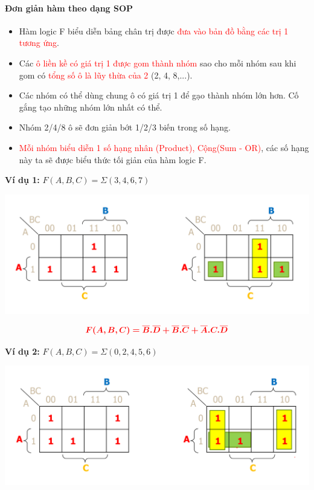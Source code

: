 \documentclass[12pt]{article}
\begin{document}
\begin{sloppypar}
\paragraph{Đơn giản hàm theo dạng SOP}

\begin{itemize}
    \item {Hàm logic F biểu diễn bảng chân trị được \textcolor{red}{đưa vào bản đồ bằng các trị 1 tương ứng}.}
    \item Các \textcolor{red}{ô liền kề có giá trị 1 được gom thành nhóm} sao cho mỗi nhóm sau khi gom có \textcolor{red}{tổng số ô là lũy thừa của 2} (2, 4, 8,...).
    \item Các nhóm có thể dùng chung ô có giá trị 1 để gạo thành nhóm lớn hơn. Cố gắng tạo những nhóm lớn nhất có thể.
    \item Nhóm 2/4/8 ô sẽ đơn giản bớt 1/2/3 biến trong số hạng.
    \item \textcolor{red}{Mỗi nhóm biểu diễn 1 số hạng nhân (Product), Cộng(Sum - OR)}, các số hạng này ta sẽ được biểu thức tối giản của hàm logic F.
\end{itemize}


\begin{tcolorbox}
    \textbf{Ví dụ 1:} \(F(A,B,C) = \Sigma(3,4,6,7)\)
\end{tcolorbox}

\includegraphics[width=15cm]{sop_ex1.png}

\begin{equation*}
    \color{red}
    \bm{F(A,B,C) = \overline{B}.\overline{D} + \overline{B}.\overline{C} + \overline{A}.C.\overline{D}}
\end{equation*}

\begin{tcolorbox}
    \textbf{Ví dụ 2:} \(F(A,B,C) = \Sigma(0,2,4,5,6)\)
\end{tcolorbox}

\includegraphics[width=15cm]{sop_ex2.png}


\end{sloppypar}
\end{document}

